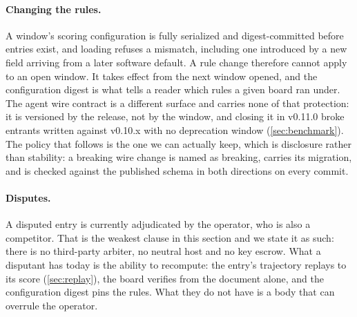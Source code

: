 \paragraph{Changing the rules.} A window's scoring configuration is fully serialized and digest-committed before entries exist, and loading refuses a mismatch, including one introduced by a new field arriving from a later software default. A rule change therefore cannot apply to an open window. It takes effect from the next window opened, and the configuration digest is what tells a reader which rules a given board ran under. The agent wire contract is a different surface and carries none of that protection: it is versioned by the release, not by the window, and closing it in v0.11.0 broke entrants written against v0.10.x with no deprecation window (\cref{sec:benchmark}). The policy that follows is the one we can actually keep, which is disclosure rather than stability: a breaking wire change is named as breaking, carries its migration, and is checked against the published schema in both directions on every commit.

\paragraph{Disputes.} A disputed entry is currently adjudicated by the operator, who is also a competitor. That is the weakest clause in this section and we state it as such: there is no third-party arbiter, no neutral host and no key escrow. What a disputant has today is the ability to recompute: the entry's trajectory replays to its score (\cref{sec:replay}), the board verifies from the document alone, and the configuration digest pins the rules. What they do not have is a body that can overrule the operator.

